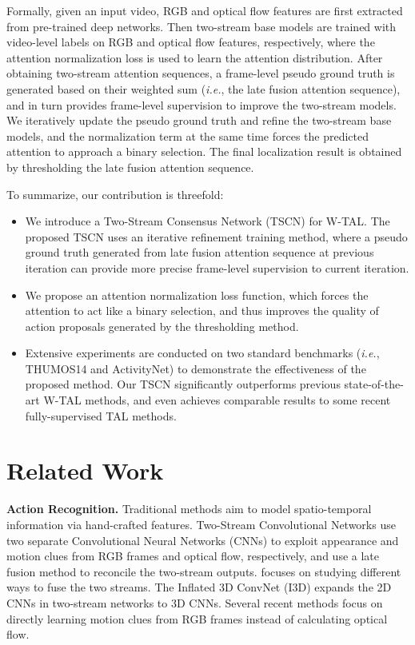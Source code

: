 \documentclass[runningheads]{llncs}
\begin{document}
Formally, given an input video, RGB and optical flow features are first extracted from pre-trained deep networks. 
Then two-stream base models are trained with video-level labels on RGB and optical flow features, respectively, where the attention normalization loss is used to learn the attention distribution.
After obtaining two-stream attention sequences, a frame-level pseudo ground truth is generated based on their weighted sum (\textit{i.e.}, the late fusion attention sequence), and in turn provides frame-level supervision to improve the two-stream models.
We iteratively update the pseudo ground truth and refine the two-stream base models, and the normalization term at the same time forces the predicted attention to approach a binary selection.
The final localization result is obtained by thresholding the late fusion attention sequence.

To summarize, our contribution is threefold:
\begin{itemize}
	\item We introduce a Two-Stream Consensus Network (TSCN) for W-TAL. The proposed TSCN uses an iterative refinement training method, where a pseudo ground truth generated from late fusion attention sequence at previous iteration can provide more precise frame-level supervision to current iteration.
	\item We propose an attention normalization loss function, which forces the attention to act like a binary selection, and thus improves the quality of action proposals generated by the thresholding method.
	\item Extensive experiments are conducted on two standard benchmarks (\textit{i.e.}, THUMOS14 and ActivityNet) to demonstrate the effectiveness of the proposed method. Our TSCN significantly outperforms previous state-of-the-art W-TAL methods, and even achieves comparable results to some recent fully-supervised TAL methods.
\end{itemize}


\section{Related Work}

\textbf{Action Recognition.} Traditional methods \cite{laptev2005space,dalal2005histograms,dalal2006human,wang2011action} aim to model spatio-temporal information via hand-crafted features. 
Two-Stream Convolutional Networks \cite{simonyan2014two} use two separate Convolutional Neural Networks (CNNs) to exploit appearance and motion clues from RGB frames and optical flow, respectively, and use a late fusion method to reconcile the two-stream outputs. \cite{feichtenhofer2016convolutional} focuses on studying different ways to fuse the two streams. 
The Inflated 3D ConvNet (I3D) \cite{carreira2017quo} expands the 2D CNNs in two-stream networks to 3D CNNs. 
Several recent methods \cite{zhao2018recognize,crasto2019mars,shou2019dmc,wang2019hallucinating,repflow2019} focus on directly learning motion clues from RGB frames instead of calculating optical flow.
\end{document}
